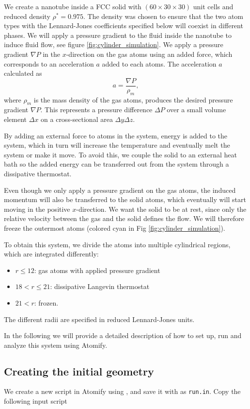 \documentclass[12pt,a4paper,final]{iopart}
\newcommand{\code}[1]{\colorbox{light-gray}{\color{RawSienna}\texttt{#1}}}
\begin{document}
We create a nanotube inside a FCC solid with $(60\times30\times30)$ unit cells and reduced density $\rho^* = 0.975$.
The density was chosen to ensure that the two atom types with the Lennard-Jones coefficients specified below will coexist in different phases. We will apply a pressure gradient to the fluid inside the nanotube to induce fluid flow, see figure \ref{fig:cylinder_simulation}.
We apply a pressure gradient $\nabla P$ in the $x$-direction on the gas atoms using an added force, which corresponds to an acceleration $a$ added to each atoms. The acceleration $a$ calculated as
\[
	a = \frac{\nabla P}{\rho_m},
\]
where $\rho_m$ is the mass density of the gas atoms, produces the desired pressure gradient $\nabla P$.
This represents a pressure difference $\Delta P$ over a small volume element $\Delta x$ on a cross-sectional area $\Delta y\Delta z$.

By adding an external force to atoms in the system, energy is added to the system, which in turn will increase the temperature and eventually melt the system or make it move.
To avoid this, we couple the solid to an external heat bath so the added energy can be transferred out from the system through a dissipative thermostat.

Even though we only apply a pressure gradient on the gas atoms, the induced momentum will also be transferred
to the solid atoms, which eventually will start moving in the positive $x$-direction.
We want the solid to be at rest, since only the relative velocity between the gas and the solid defines
the flow. We will therefore freeze the outermost atoms (colored cyan in Fig \ref{fig:cylinder_simulation}).

To obtain this system, we divide the atoms into multiple cylindrical regions, which are integrated differently:

\begin{itemize}
	\item $r \leq 12$: gas atoms with applied pressure gradient
	\item $18 < r \leq 21$: dissipative Langevin thermostat
	\item $21 < r$: frozen.
\end{itemize}

The different radii are specified in reduced Lennard-Jones units.

In the following we will provide a detailed description of how to set up, run and analyze this system using Atomify.

\subsection{Creating the initial geometry}
We create a new script in Atomify using , and save it with  as \code{run.in}.
Copy the following input script
\end{document}
